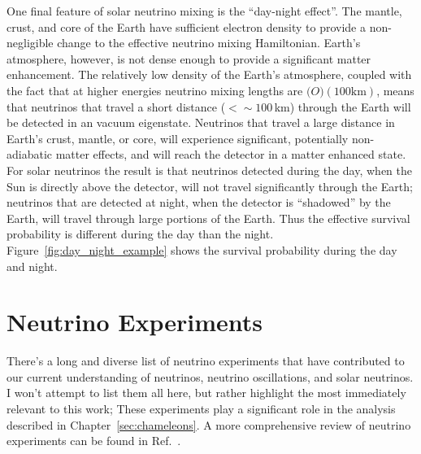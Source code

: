 One final feature of solar neutrino mixing is the ``day-night effect''.
The mantle, crust, and core of the Earth have sufficient electron density to provide
a non-negligible change to the effective neutrino mixing Hamiltonian.
Earth's atmosphere, however, is not dense enough to provide a significant
matter enhancement.
The relatively low density of the Earth's atmosphere, coupled with the fact
that at higher energies neutrino mixing lengths
are $\mathcal(O)(100\mathrm{ km})$, means that neutrinos that travel a short
distance ($<\sim100$\,km) through the Earth will be detected in an
vacuum eigenstate.
Neutrinos that travel a large distance in Earth's crust, mantle, or core,
will experience significant, potentially non-adiabatic matter effects, and will
reach the detector in a matter enhanced state.
For solar neutrinos the result is that neutrinos detected during the day, when
the Sun is directly above the detector, will not travel significantly through
the Earth;
neutrinos that are detected at night, when the detector is ``shadowed'' by the
Earth, will travel through large portions of the Earth.
Thus the effective survival probability is different during the day than the night.
Figure~\ref{fig:day_night_example} shows the survival probability during
the day and night.

\section{Neutrino Experiments}
\label{sec:experiments}
There's a long and diverse list of neutrino experiments that have contributed to
our current understanding of neutrinos, neutrino oscillations, and solar neutrinos.
I won't attempt to list them all here, but rather highlight the most immediately
relevant to this work;
These experiments play a significant role in the analysis described in Chapter~\ref{sec:chameleons}.
A more comprehensive review of neutrino experiments can be found in Ref.~\citep{giuntikim}.

